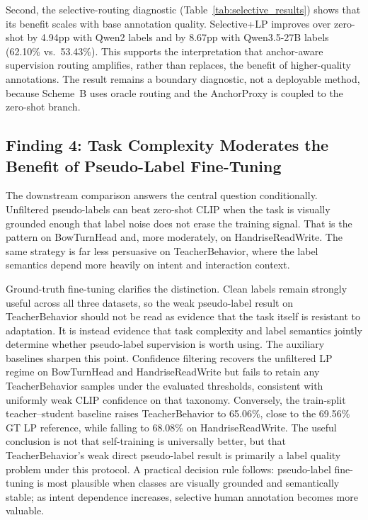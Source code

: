 \documentclass{ieeeaccess}
\begin{document}
Second, the selective-routing diagnostic (Table~\ref{tab:selective_results})
shows that its benefit scales with base annotation quality.
Selective+LP improves over zero-shot by 4.94pp with Qwen2 labels and by
8.67pp with Qwen3.5-27B labels (62.10\% vs.\ 53.43\%).
This supports the interpretation that anchor-aware supervision routing
amplifies, rather than replaces, the benefit of higher-quality annotations.
The result remains a boundary diagnostic, not a deployable method, because
Scheme~B uses oracle routing and the AnchorProxy is coupled to the
zero-shot branch.

\subsection{Finding 4: Task Complexity Moderates the Benefit of
Pseudo-Label Fine-Tuning}

The downstream comparison answers the central question
conditionally.
Unfiltered pseudo-labels can beat zero-shot CLIP when the task is
visually grounded enough that label noise does not erase the training
signal.
That is the pattern on BowTurnHead and, more moderately, on
HandriseReadWrite.
The same strategy is far less persuasive on TeacherBehavior, where the
label semantics depend more heavily on intent and interaction context.

Ground-truth fine-tuning clarifies the distinction.
Clean labels remain strongly useful across all three datasets, so the
weak pseudo-label result on TeacherBehavior should not be read as
evidence that the task itself is resistant to adaptation.
It is instead evidence that task complexity and label semantics jointly
determine whether pseudo-label supervision is worth using.
The auxiliary baselines sharpen this point. Confidence filtering
recovers the unfiltered LP regime on BowTurnHead and HandriseReadWrite
but fails to retain any TeacherBehavior samples under the evaluated
thresholds, consistent with uniformly weak CLIP confidence on that
taxonomy. Conversely, the train-split teacher--student baseline raises
TeacherBehavior to 65.06\%, close to the 69.56\% GT LP reference, while
falling to 68.08\% on HandriseReadWrite. The useful conclusion is
not that self-training is universally better, but that
TeacherBehavior's weak direct pseudo-label result is primarily a label
quality problem under this protocol.
A practical decision rule follows: pseudo-label fine-tuning is most
plausible when classes are visually grounded and semantically stable;
as intent dependence increases, selective human annotation becomes more
valuable.
\end{document}
